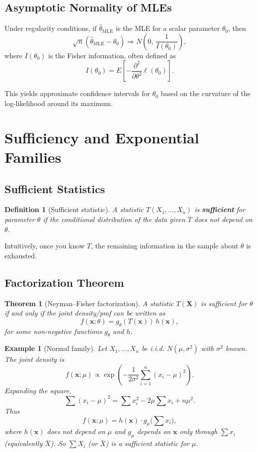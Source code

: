 \documentclass[11pt,a4paper]{article}
\newtheorem{definition}{Definition}[section]
\newtheorem{theorem}{Theorem}[section]
\newtheorem{example}{Example}[section]
\begin{document}
\subsection{Asymptotic Normality of MLEs}

Under regularity conditions, if $\hat{\theta}_{\text{MLE}}$ is the MLE for a scalar parameter $\theta_0$, then
\[
\sqrt{n}(\hat{\theta}_{\text{MLE}} - \theta_0)
\Rightarrow N\left(0,\,\frac{1}{I(\theta_0)}\right),
\]
where $I(\theta_0)$ is the Fisher information, often defined as
\[
I(\theta_0) = E\left[ -\frac{\partial^2}{\partial \theta^2} \ell(\theta_0) \right].
\]

This yields approximate confidence intervals for $\theta_0$ based on the curvature of the log-likelihood around its maximum.

\newpage

\section{Sufficiency and Exponential Families}

\subsection{Sufficient Statistics}

\begin{definition}[Sufficient statistic]
A statistic $T(X_1,\dots,X_n)$ is \textbf{sufficient} for parameter $\theta$ if the conditional distribution of the data given $T$ does not depend on $\theta$.
\end{definition}

Intuitively, once you know $T$, the remaining information in the sample about $\theta$ is exhausted.

\subsection{Factorization Theorem}

\begin{theorem}[Neyman–Fisher factorization]
A statistic $T(\bm{X})$ is sufficient for $\theta$ if and only if the joint density/pmf can be written as
\[
f(\bm{x};\theta) = g_\theta(T(\bm{x}))\, h(\bm{x}),
\]
for some non-negative functions $g_\theta$ and $h$.
\end{theorem}

\begin{example}[Normal family]
Let $X_1,\dots,X_n$ be i.i.d. $N(\mu,\sigma^2)$ with $\sigma^2$ known. 
The joint density is
\[
f(\bm{x};\mu) \propto
\exp\left(
-\frac{1}{2\sigma^2}\sum_{i=1}^n (x_i - \mu)^2
\right).
\]
Expanding the square,
\[
\sum (x_i - \mu)^2
= \sum x_i^2 - 2\mu\sum x_i + n\mu^2.
\]
Thus
\[
f(\bm{x};\mu)
= h(\bm{x}) \cdot g_\mu\Big(\sum x_i\Big),
\]
where $h(\bm{x})$ does not depend on $\mu$ and $g_\mu$ depends on $\bm{x}$ only through $\sum x_i$ (equivalently $\bar{X}$). 
So $\sum X_i$ (or $\bar{X}$) is a sufficient statistic for $\mu$.

\end{example}
\end{document}
